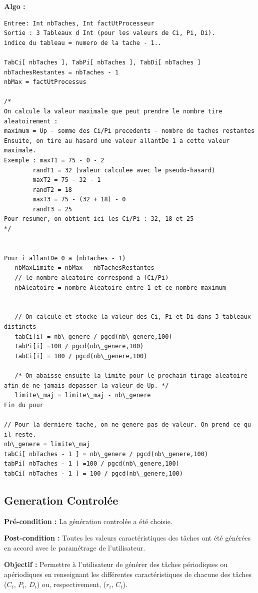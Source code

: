 			\textbf{Algo :}
			\begin{lstlisting}
Entree: Int nbTaches, Int factUtProcesseur
Sortie : 3 Tableaux d Int (pour les valeurs de Ci, Pi, Di). 
indice du tableau = numero de la tache - 1..

TabCi[ nbTaches ], TabPi[ nbTaches ], TabDi[ nbTaches ]
nbTachesRestantes = nbTaches - 1
nbMax = factUtProcessus 

/*
On calcule la valeur maximale que peut prendre le nombre tire aleatoirement :
maximum = Up - somme des Ci/Pi precedents - nombre de taches restantes
Ensuite, on tire au hasard une valeur allantDe 1 a cette valeur maximale.
Exemple : maxT1 = 75 - 0 - 2
	    randT1 = 32 (valeur calculee avec le pseudo-hasard)
	    maxT2 = 75 - 32 - 1
	    randT2 = 18
	    maxT3 = 75 - (32 + 18) - 0
	    randT3 = 25
Pour resumer, on obtient ici les Ci/Pi : 32, 18 et 25
*/


Pour i allantDe 0 a (nbTaches - 1)
   nbMaxLimite = nbMax - nbTachesRestantes
   // le nombre aleatoire correspond a (Ci/Pi)
   nbAleatoire = nombre Aleatoire entre 1 et ce nombre maximum


   // On calcule et stocke la valeur des Ci, Pi et Di dans 3 tableaux distincts
   tabCi[i] = nb\_genere / pgcd(nb\_genere,100)
   tabPi[i] =100 / pgcd(nb\_genere,100)
   tabCi[i] = 100 / pgcd(nb\_genere,100)
	        
   /* On abaisse ensuite la limite pour le prochain tirage aleatoire afin de ne jamais depasser la valeur de Up. */
   limite\_maj = limite\_maj - nb\_genere
Fin du pour

// Pour la derniere tache, on ne genere pas de valeur. On prend ce qu il reste.
nb\_genere = limite\_maj
tabCi[ nbTaches - 1 ] = nb\_genere / pgcd(nb\_genere,100)
tabPi[ nbTaches - 1 ] =100 / pgcd(nb\_genere,100)
tabCi[ nbTaches - 1 ] = 100 / pgcd(nb\_genere,100)
			\end{lstlisting}

		\subsection{Generation Controlée}  
			\textbf{Pré-condition :} La génération controlée a été choisie.
		
			\textbf{Post-condition :} Toutes les valeurs caractéristiques des tâches ont été générées en accord avec le paramétrage de l’utilisateur.
		
			\textbf{Objectif :} Permettre à l’utilisateur de générer des tâches périodiques ou apériodiques en renseignant les différentes caractéristiques de chacune des tâches ($C_i$, $P_i$, $D_i$) ou, respectivement, ($r_i$, $C_i$).
		
